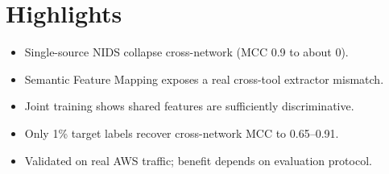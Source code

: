 \documentclass{article}
\begin{document}
\section*{Highlights}
\begin{itemize}
  \item Single-source NIDS collapse cross-network (MCC 0.9 to about 0).
  \item Semantic Feature Mapping exposes a real cross-tool extractor mismatch.
  \item Joint training shows shared features are sufficiently discriminative.
  \item Only 1\% target labels recover cross-network MCC to 0.65--0.91.
  \item Validated on real AWS traffic; benefit depends on evaluation protocol.
\end{itemize}
\end{document}
